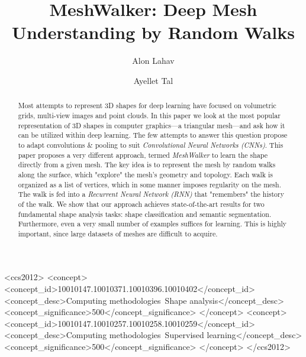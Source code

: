 \documentclass[acmtog]{acmart}
\begin{document}
\title{MeshWalker: Deep Mesh Understanding by Random Walks}

\author{Alon Lahav}
\author{Ayellet Tal}




\begin{CCSXML}
<ccs2012>
   <concept>
       <concept_id>10010147.10010371.10010396.10010402</concept_id>
       <concept_desc>Computing methodologies~Shape analysis</concept_desc>
       <concept_significance>500</concept_significance>
       </concept>
   <concept>
       <concept_id>10010147.10010257.10010258.10010259</concept_id>
       <concept_desc>Computing methodologies~Supervised learning</concept_desc>
       <concept_significance>500</concept_significance>
       </concept>
 </ccs2012>
\end{CCSXML}



\begin{abstract}
Most attempts to represent  3D shapes for deep learning have focused on volumetric grids, multi-view images and point clouds.
In this paper we look at the most popular representation of 3D shapes in computer graphics---a triangular mesh---and ask how it can be utilized within deep learning.
The few attempts to answer this question propose to adapt convolutions \& pooling to suit {\em Convolutional Neural Networks (CNNs)}.
This paper proposes a very different approach, termed {\em MeshWalker} 
to learn the shape directly from a given mesh.
The key idea is to represent the mesh by random walks along the surface, which "explore" the mesh's geometry and topology.
Each walk is organized as a list of vertices, which in some manner imposes regularity on the mesh.
The walk is fed into  a {\em Recurrent Neural Network (RNN)} that "remembers" the history of the walk.
We show that our approach achieves state-of-the-art results for two fundamental shape analysis tasks: shape classification and semantic segmentation.
Furthermore, even a very small number of examples suffices for learning.
This is highly important, since large datasets of meshes are difficult to acquire.
\end{abstract}


\end{document}
